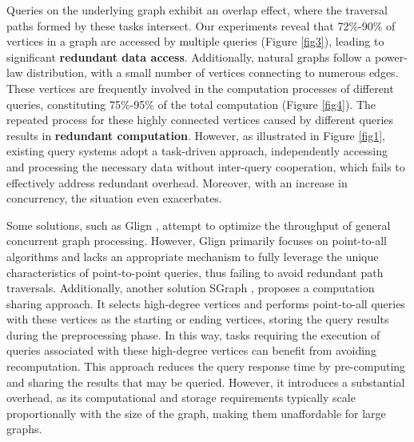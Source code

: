 \documentclass[10pt,journal,compsoc]{IEEEtran}
\begin{document}
Queries on the underlying graph exhibit an overlap effect, where the traversal paths formed by these tasks intersect. Our experiments reveal that 72\%-90\% of vertices in a graph are accessed by multiple queries (Figure \ref{fig3}), leading to significant {\bf{redundant data access}}.
Additionally, natural graphs follow a power-law distribution, with a small number of vertices connecting to numerous edges. These vertices are frequently involved in the computation processes of different queries, constituting 75\%-95\% of the total computation (Figure \ref{fig4}). The repeated process for these highly connected vertices caused by different queries results in {\bf{redundant computation}}.
However, as illustrated in Figure \ref{fig1}, existing query systems adopt a task-driven approach, independently accessing and processing the necessary data without inter-query cooperation, which fails to effectively address redundant overhead. Moreover, with an increase in concurrency, the situation even exacerbates.

Some solutions, such as Glign \cite{glign}, attempt to optimize the throughput of general concurrent graph processing. However, Glign primarily focuses on point-to-all algorithms and lacks an appropriate mechanism to fully leverage the unique characteristics of point-to-point queries, thus failing to avoid redundant path traversals.
Additionally, another solution SGraph \cite{sgraph}, proposes a computation sharing approach. It selects high-degree vertices and performs point-to-all queries with these vertices as the starting or ending vertices, storing the query results during the preprocessing phase.
In this way, tasks requiring the execution of queries associated with these high-degree vertices can benefit from avoiding recomputation.
This approach reduces the query response time by pre-computing and sharing the results that may be queried. 
However, it introduces a substantial overhead, as its computational and storage requirements typically scale proportionally with the size of the graph, making them unaffordable for large graphs.
\end{document}
